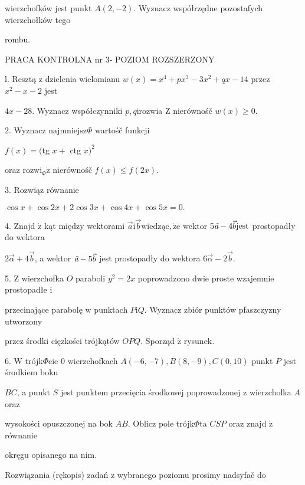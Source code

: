 \documentclass[a4paper,12pt]{article}
\begin{document}
wierzchofków jest punkt $A(2,-2)$. Wyznacz współrzędne pozostafych wierzchołków tego

rombu.




PRACA KONTROLNA nr 3- POZIOM ROZSZERZONY

l. Resztą $\mathrm{z}$ dzielenia wielomianu $w(x) =x^{4}+px^{3}-3x^{2}+qx-14$ przez $x^{2}-x-2$ jest

$4x-28$. Wyznacz współczynniki $p, q\mathrm{i}$rozwia $\dot{\mathrm{Z}}$ nierównośč $w(x)\geq 0.$

2. Wyznacz $\mathrm{n}\mathrm{a}\mathrm{j}\mathrm{m}\mathrm{n}\mathrm{i}\mathrm{e}\mathrm{j}\mathrm{s}\mathrm{z}\Phi$ wartośč funkcji

$f(x)=($tg $x+$ ctg $x)^{2}$

oraz $\mathrm{r}\mathrm{o}\mathrm{z}\mathrm{w}\mathrm{i}_{\Phi}\dot{\mathrm{z}}$ nierównośč $f(x)\leq f(2x).$

3. Rozwiąz równanie

$\cos x+\cos 2x+2\cos 3x+\cos 4x+\cos 5x=0.$

4. Znajd $\acute{\mathrm{z}}$ kąt między wektorami $\vec{a}\mathrm{i}\vec{b}\mathrm{w}\mathrm{i}\mathrm{e}\mathrm{d}\mathrm{z}\text{ą} \mathrm{c}, \dot{\mathrm{z}}\mathrm{e}$ wektor $5\text{{\it ã}}-4\vec{b}\mathrm{j}\mathrm{e}\mathrm{s}\mathrm{t}$ prostopadły do wektora

$2\vec{\alpha}+4\vec{b}$, a wektor $\text{{\it ã}}-5\vec{b}$ jest prostopadły do wektora $6\vec{\alpha}-2\vec{b}.$

5. $\mathrm{Z}$ wierzchofka $O$ paraboli $y^{2}=2x$ poprowadzono dwie proste wzajemnie prostopadłe $\mathrm{i}$

przecinające parabolę $\mathrm{w}$ punktach $P\mathrm{i}Q$. Wyznacz zbiór punktów pfaszczyzny utworzony

przez środki cięzkości trójkątów $OPQ.$ Sporząd $\acute{\mathrm{z}}$ rysunek.

6. $\mathrm{W}$ trójk$\Phi$cie $0$ wierzchofkach $A(-6,-7), B(8,-9), C(0,10)$ punkt $P$ jest środkiem boku

$BC$, a punkt $S$ jest punktem przecięcia środkowej poprowadzonej $\mathrm{z}$ wierzcholka $A$ oraz

wysokości opuszczonej na bok $AB$. Oblicz pole trójk$\Phi$ta $CSP$ oraz znajd $\acute{\mathrm{z}}$ równanie

okręgu opisanego na nim.

Rozwiązania (rękopis) zadań z wybranego poziomu prosimy nadsyfač do
\end{document}
